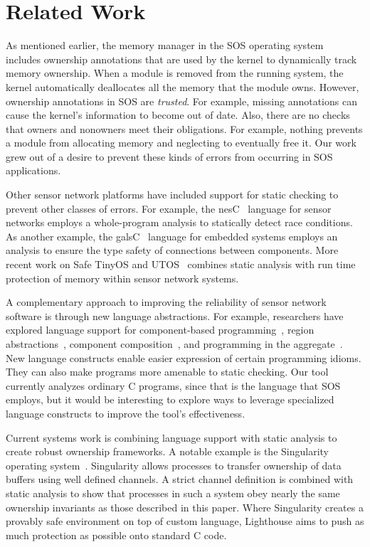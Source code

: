 \section{Related Work}
\label{sec:related}


As mentioned earlier, the memory manager in the SOS operating
system~\cite{sos} includes ownership annotations that are used by the kernel
to dynamically track memory ownership.  When a module is removed from the
running system, the kernel automatically deallocates all the memory that the
module owns.  However, ownership annotations in SOS are {\em trusted}.  For
example, missing annotations can cause the kernel's information to become out
of date.  Also, there are no checks that owners and nonowners meet their
obligations.  For example, nothing prevents a module from allocating memory
and neglecting to eventually free it.  Our work grew out of a desire to
prevent these kinds of errors from occurring in SOS applications.


Other sensor network platforms have included support for static
checking to prevent other classes of errors.  For example, the
nesC~\cite{nesC} language for sensor networks employs a whole-program
analysis to statically detect race conditions.  As another example,
the galsC~\cite{TinyGALS, galsC} language for embedded systems employs
an analysis to ensure the type safety of connections between
components.  More recent work on Safe TinyOS and
UTOS~\cite{regehr06memory} combines static analysis with run time
protection of memory within sensor network systems.


A complementary approach to improving the reliability of sensor
network software is through new language abstractions.  For example,
researchers have explored language support for component-based
programming~\cite{TinyOS,nesC,galsC}, region
abstractions~\cite{conf/mobisys/WhitehouseSCB04,conf/nsdi/WelshM04},
component composition~\cite{conf/sensys/GreensteinKE04}, and
programming in the aggregate~\cite{1052213,conf/dcoss/GummadiGG05}.
New language constructs enable easier expression of certain
programming idioms.  They can also make programs more amenable to
static checking.  Our tool currently analyzes ordinary C programs,
since that is the language that SOS employs, but it would be
interesting to explore ways to leverage specialized language
constructs to improve the tool's effectiveness.


Current systems work is combining language support with static
analysis to create robust ownership frameworks.  A notable example is
the Singularity operating system~\cite{fahndrich06language}.
Singularity allows processes to transfer ownership of data buffers
using well defined channels.  A strict channel definition is combined
with static analysis to show that processes in such a system obey
nearly the same ownership invariants as those described in this paper.
Where Singularity creates a provably safe environment on top of custom
language, Lighthouse aims to push as much protection as possible onto
standard C code.


